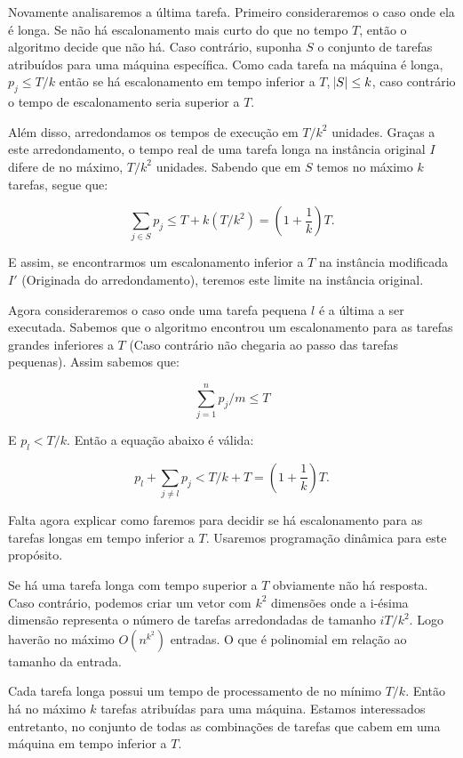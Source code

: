Novamente analisaremos a última tarefa. Primeiro consideraremos o caso onde ela é longa. Se não há escalonamento mais curto do que no tempo $T$, então o algoritmo decide que não há. Caso contrário, suponha $S$ o conjunto de tarefas atribuídos para uma máquina específica. Como cada tarefa na máquina é longa, $p_j \leq T/k$ então se há escalonamento em tempo inferior a $T$, $\abs{S} \leq k$, caso contrário o tempo de escalonamento seria superior a $T$. 

Além disso, arredondamos os tempos de execução em $T/k^2$ unidades. Graças a este arredondamento, o tempo real de uma tarefa longa na instância original $I$ difere de no máximo, $T/k^2$ unidades. Sabendo que em $S$ temos no máximo $k$ tarefas, segue que:

\begin{equation}
\sum_{j \in S} p_j \leq T + k ( T / k^2) = \left(1 + \frac{1}{k}\right) T.
\end{equation}

E assim, se encontrarmos um escalonamento inferior a $T$ na instância modificada $I'$ (Originada do arredondamento), teremos este limite na instância original.

Agora consideraremos o caso onde uma tarefa pequena $l$ é a última a ser executada. Sabemos que o algoritmo encontrou um escalonamento para as tarefas grandes inferiores a $T$ (Caso contrário não chegaria ao passo das tarefas pequenas). Assim sabemos que:

\begin{equation}
\sum_{j=1}^{n} p_j/m \leq T
\end{equation}

E $p_l < T / k$. Então a equação abaixo é válida:

\begin{equation}
p_l + \sum_{ j \neq l} p_j < T / k + T = \left(1 + \frac{1}{k}\right) T.
\end{equation}

Falta agora explicar como faremos para decidir se há escalonamento para as tarefas longas em tempo inferior a $T$. Usaremos programação dinâmica para este propósito. 

Se há uma tarefa longa com tempo superior a $T$ obviamente não há resposta. Caso contrário, podemos criar um vetor com $k^2$ dimensões onde a i-ésima dimensão representa o número de tarefas arredondadas de tamanho $iT/k^2$. Logo haverão no máximo $O(n^{k^2})$ entradas. O que é polinomial em relação ao tamanho da entrada.

Cada tarefa longa possui um tempo de processamento de no mínimo $T/k$. Então há no máximo $k$ tarefas atribuídas para uma máquina. Estamos interessados entretanto, no conjunto de todas as combinações de tarefas que cabem em uma máquina em tempo inferior a $T$. 

